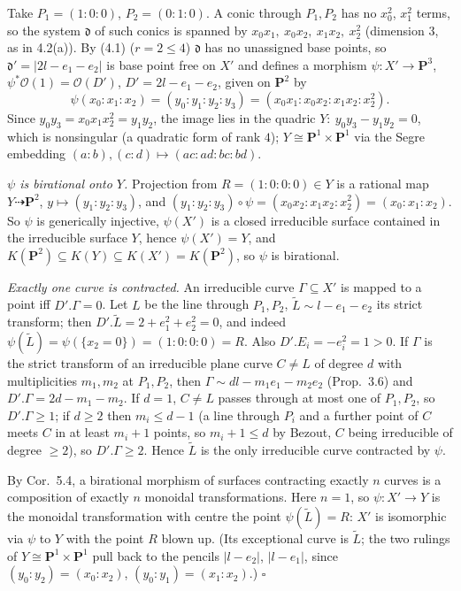 \documentclass[11pt]{article}
\begin{document}
\pf
Take $P_1=(1:0:0)$, $P_2=(0:1:0)$. A conic through $P_1,P_2$ has no $x_0^2$, $x_1^2$ terms, so the system $\mathfrak d$ of such conics is spanned by $x_0x_1,\ x_0x_2,\ x_1x_2,\ x_2^2$ (dimension $3$, as in 4.2(a)). By (4.1) ($r=2\le4$) $\mathfrak d$ has no unassigned base points, so $\mathfrak d'=|2l-e_1-e_2|$ is base point free on $X'$ and defines a morphism $\psi:X'\to\mathbf P^3$, $\psi^*\mathcal O(1)=\mathcal O(D')$, $D'=2l-e_1-e_2$, given on $\mathbf P^2$ by
\[
\psi(x_0:x_1:x_2)=(y_0:y_1:y_2:y_3)=(x_0x_1:x_0x_2:x_1x_2:x_2^2).
\]
Since $y_0y_3=x_0x_1x_2^2=y_1y_2$, the image lies in the quadric $Y:\ y_0y_3-y_1y_2=0$, which is nonsingular (a quadratic form of rank $4$); $Y\cong\mathbf P^1\times\mathbf P^1$ via the Segre embedding $(a:b),(c:d)\mapsto(ac:ad:bc:bd)$.

\emph{$\psi$ is birational onto $Y$.} Projection from $R=(1:0:0:0)\in Y$ is a rational map $Y\dashrightarrow\mathbf P^2$, $y\mapsto(y_1:y_2:y_3)$, and $(y_1:y_2:y_3)\circ\psi=(x_0x_2:x_1x_2:x_2^2)=(x_0:x_1:x_2)$. So $\psi$ is generically injective, $\psi(X')$ is a closed irreducible surface contained in the irreducible surface $Y$, hence $\psi(X')=Y$, and $K(\mathbf P^2)\subseteq K(Y)\subseteq K(X')=K(\mathbf P^2)$, so $\psi$ is birational.

\emph{Exactly one curve is contracted.} An irreducible curve $\Gamma\subseteq X'$ is mapped to a point iff $D'.\Gamma=0$. Let $L$ be the line through $P_1,P_2$, $\widetilde L\sim l-e_1-e_2$ its strict transform; then $D'.\widetilde L=2+e_1^2+e_2^2=0$, and indeed $\psi(\widetilde L)=\psi(\{x_2=0\})=(1:0:0:0)=R$. Also $D'.E_i=-e_i^2=1>0$. If $\Gamma$ is the strict transform of an irreducible plane curve $C\ne L$ of degree $d$ with multiplicities $m_1,m_2$ at $P_1,P_2$, then $\Gamma\sim dl-m_1e_1-m_2e_2$ (Prop.~3.6) and $D'.\Gamma=2d-m_1-m_2$. If $d=1$, $C\ne L$ passes through at most one of $P_1,P_2$, so $D'.\Gamma\ge1$; if $d\ge2$ then $m_i\le d-1$ (a line through $P_i$ and a further point of $C$ meets $C$ in at least $m_i+1$ points, so $m_i+1\le d$ by Bezout, $C$ being irreducible of degree $\ge 2$), so $D'.\Gamma\ge2$. Hence $\widetilde L$ is the only irreducible curve contracted by $\psi$.

By Cor.~5.4, a birational morphism of surfaces contracting exactly $n$ curves is a composition of exactly $n$ monoidal transformations. Here $n=1$, so $\psi:X'\to Y$ is the monoidal transformation with centre the point $\psi(\widetilde L)=R$: $X'$ is isomorphic via $\psi$ to $Y$ with the point $R$ blown up. (Its exceptional curve is $\widetilde L$; the two rulings of $Y\cong\mathbf P^1\times\mathbf P^1$ pull back to the pencils $|l-e_2|$, $|l-e_1|$, since $(y_0:y_2)=(x_0:x_2)$, $(y_0:y_1)=(x_1:x_2)$.) \hfill$\square$
\end{document}
